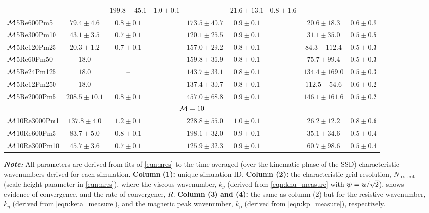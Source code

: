 \begin{table}
{{\begin{threeparttable}
\begin{tabular}{l cc l cc l cc}
	&& $199.8 \pm 45.1$ & $1.0 \pm 0.1$
	&& $21.6 \pm 13.1$ & $0.8 \pm 1.6$ \\
$\mathcal{M}$5Re600Pm5
	& $79.4 \pm 4.6$ & $0.8 \pm 0.1$
	&& $173.5 \pm 40.7$ & $0.9 \pm 0.1$
	&& $20.6 \pm 18.3$ & $0.6 \pm 0.8$ \\
$\mathcal{M}$5Re300Pm10
	& $43.1 \pm 3.5$ & $0.7 \pm 0.1$
	&& $120.1 \pm 26.5$ & $0.9 \pm 0.1$
	&& $31.1 \pm 35.0$ & $0.5 \pm 0.5$ \\
$\mathcal{M}$5Re120Pm25
	& $20.3 \pm 1.2$ & $0.7 \pm 0.1$
	&& $157.0 \pm 29.2$ & $0.8 \pm 0.1$
	&& $84.3 \pm 112.4$ & $0.5 \pm 0.3$ \\
$\mathcal{M}$5Re60Pm50
	& $18.0$ & --
	&& $159.8 \pm 36.9$ & $0.8 \pm 0.1$
	&& $75.7 \pm 99.4$ & $0.5 \pm 0.3$ \\
$\mathcal{M}$5Re24Pm125
	& $18.0$ & --
	&& $143.7 \pm 33.1$ & $0.8 \pm 0.1$
	&& $134.4 \pm 169.0$ & $0.5 \pm 0.3$ \\
$\mathcal{M}$5Re12Pm250
	& $18.0$ & --
	&& $137.4 \pm 30.7$ & $0.8 \pm 0.1$
	&& $112.5 \pm 54.6$ & $0.6 \pm 0.2$ \\
$\mathcal{M}$5Re2000Pm5
	& $208.5 \pm 10.1$ & $0.8 \pm 0.1$
	&& $457.0 \pm 68.8$ & $0.9 \pm 0.1$
	&& $146.1 \pm 161.6$ & $0.5 \pm 0.2$ \\
\hline
\multicolumn{9}{c}{$\mathcal{M} = 10$} \\
\hline
$\mathcal{M}$10Re3000Pm1
	& $137.8 \pm 4.0$ & $1.2 \pm 0.1$
	&& $228.8 \pm 55.0$ & $1.0 \pm 0.1$
	&& $26.2 \pm 12.2$ & $0.8 \pm 0.6$ \\
$\mathcal{M}$10Re600Pm5
	& $83.7 \pm 5.0$ & $0.8 \pm 0.1$
	&& $198.1 \pm 32.0$ & $0.9 \pm 0.1$
	&& $35.1 \pm 34.6$ & $0.5 \pm 0.4$ \\
$\mathcal{M}$10Re300Pm10
	& $45.7 \pm 3.6$ & $0.7 \pm 0.1$
	&& $125.9 \pm 32.3$ & $0.9 \pm 0.1$
	&& $60.7 \pm 98.6$ & $0.5 \pm 0.4$ \\
\hline
\hline
\end{tabular}

\begin{tablenotes}
    \textit{\textbf{Note:}} All parameters are derived from fits of \autoref{eqn:nres} to the time averaged (over the kinematic phase of the SSD) characteristic wavenumbers derived for each simulation. \textbf{Column (1):} unique simulation ID. \textbf{Column (2):} the characteristic grid resolution, $N_{\mathrm{res}, \mathrm{crit}}$ (scale-height parameter in \autoref{eqn:nres}), where the viscous wavenumber, $k_{\nu}$ (derived from \autoref{eqn:knu_measure} with $\bm{\psi} = \bm{u} / \sqrt{2}$), shows evidence of convergence, and the rate of convergence, $R$. \textbf{Column (3) and (4):} the same as column (2) but for the resistive wavenumber, $k_\eta$ (derived from \autoref{eqn:keta_measure}), and the magnetic peak wavenumber, $k_\mathrm{p}$ (derived from \autoref{eqn:kp_measure}), respectively.
\end{tablenotes}
\end{threeparttable}%
}%
}
\end{table}

